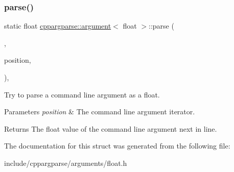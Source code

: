 \subsubsection{\texorpdfstring{parse()}{parse()}}
{\footnotesize\ttfamily static float \hyperlink{structcppargparse_1_1argument}{cppargparse\+::argument}$<$ float $>$\+::parse (\begin{DoxyParamCaption}\item[{const types\+::\+Command\+Line\+\_\+t \&}]{,  }\item[{const types\+::\+Command\+Line\+Position\+\_\+t \&}]{position,  }\item[{const types\+::\+Command\+Line\+Arguments\+\_\+t \&}]{ }\end{DoxyParamCaption})\hspace{0.3cm}{\ttfamily [inline]}, {\ttfamily [static]}}



Try to parse a command line argument as a float. 


\begin{DoxyParams}{Parameters}
{\em position} & The command line argument iterator.\\
\hline
\end{DoxyParams}
\begin{DoxyReturn}{Returns}
The float value of the command line argument next in line. 
\end{DoxyReturn}


The documentation for this struct was generated from the following file\+:\begin{DoxyCompactItemize}
\item 
include/cppargparse/arguments/float.\+h\end{DoxyCompactItemize}
